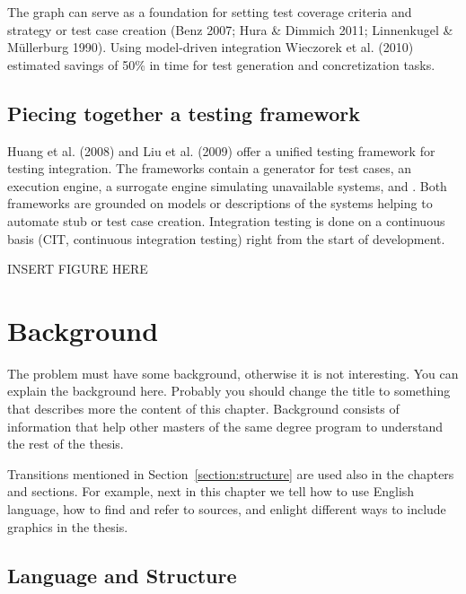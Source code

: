 \documentclass[12pt,a4paper,oneside,pdftex]{report}
\begin{document}
The graph can serve as a foundation for setting test coverage criteria and strategy or test case creation (Benz 2007; Hura \& Dimmich 2011; Linnenkugel \& Müllerburg 1990). Using model-driven integration Wieczorek et al. (2010) estimated savings of 50\% in time for test generation and concretization tasks.

\section{Piecing together a testing framework}

Huang et al. (2008) and Liu et al. (2009) offer a unified testing framework for testing integration. The 
frameworks contain a generator for test cases, an execution engine, a surrogate engine 
simulating unavailable systems, and . Both frameworks are grounded on models or descriptions of the systems helping to automate stub or test case creation. Integration testing is done on a continuous basis (CIT, continuous integration testing) right from the start of development.


INSERT FIGURE HERE


% 
\chapter{Background}
\label{chapter:background}
The problem must have some background, otherwise it is not
interesting.  You can explain the background here. Probably you should
change the title to something that describes more the content of this
chapter. Background consists of information that help other masters of
the same degree program to understand the rest of the thesis.

Transitions mentioned in Section~\ref{section:structure} are used also
in the chapters and sections. For example, next in this chapter we
tell how to use English language, how to find and refer to sources,
and enlight different ways to include graphics in the thesis.

\section{Language and Structure}
\end{document}
